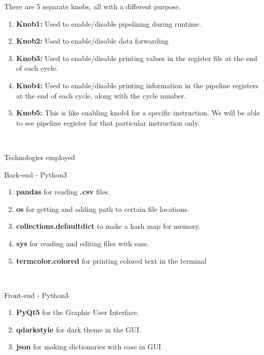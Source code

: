 \documentclass{article}
\begin{document}
There are 5 separate knobs, all with a different purpose.\\
\begin{enumerate}
  \item {\bf Knob1:} Used to enable/disable pipelining during runtime. 
  \item {\bf Knob2:} Used to enable/disable data forwarding
  \item {\bf Knob3:} Used to enable/disable printing values in the register file at the end of each cycle.
  \item {\bf Knob4:} Used to enable/disable printing information in the pipeline registers at the end of each cycle, along with the cycle number.
  \item {\bf Knob5:} This is like enabling knob4 for a specific instruction. We will be able to see pipeline register for that particular instruction only.
\end{enumerate}\\
\newpage
\begin{centering}
\begin{Huge}
\begin{bf}
\vspace{2.0cm}
\textsf{Technologies employed}\\
\end{bf}
\end{Huge}
\end{centering}
\protect\vspace{2.0cm}
\textbf{}
\huge
Back-end - Python3
\begin{enumerate}
  \item {\bf pandas} for reading {\bf .csv} files.
  \item {\bf os} for getting and adding path to certain file locations.
  \item {\bf collections.defaultdict} to make a hash map for memory.
  \item {\bf sys} for reading and editing files with ease.
  \item {\bf termcolor.colored} for printing colored text in the terminal
\end{enumerate}\\
\textbf{}

Front-end - Python3
\begin{enumerate}
  \item {\bf PyQt5} for the Graphic User Interface.
  \item {\bf qdarkstyle} for dark theme in the GUI.
  \item {\bf json} for making dictionaries with ease in GUI
\end{enumerate}
\end{document}
